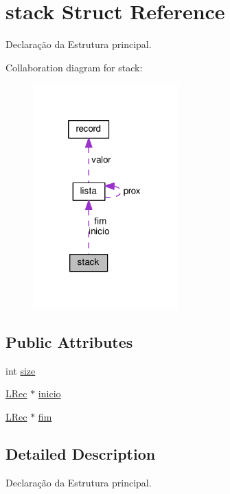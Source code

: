 \hypertarget{structstack}{\section{stack Struct Reference}
\label{structstack}
}


Declaração da Estrutura principal.  




Collaboration diagram for stack\+:\nopagebreak
\begin{figure}[H]
\begin{center}
\leavevmode
\includegraphics[width=158pt]{structstack__coll__graph}
\end{center}
\end{figure}
\subsection*{Public Attributes}
\begin{DoxyCompactItemize}
\item 
int \hyperlink{structstack_a926a597bae913d1bf4772be35c14b71e}{size}
\item 
\hyperlink{stack_8c_ab3843315393c74d2ade69877ac22d661}{L\+Rec} $\ast$ \hyperlink{structstack_ab847cafd4234504d5eed198cf88cbbf8}{inicio}
\item 
\hyperlink{stack_8c_ab3843315393c74d2ade69877ac22d661}{L\+Rec} $\ast$ \hyperlink{structstack_a802d8229341bbd71d5ef20c499753070}{fim}
\end{DoxyCompactItemize}


\subsection{Detailed Description}
Declaração da Estrutura principal. 

